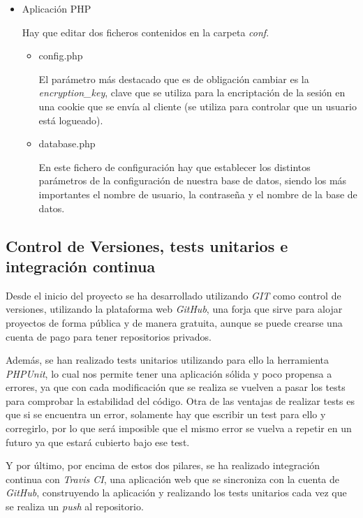 \begin{itemize}
		\item Aplicación PHP

			Hay que editar dos ficheros contenidos en la carpeta \emph{conf}.

			\begin{itemize}
				\item config.php

				El parámetro más destacado que es de obligación cambiar es la \emph{encryption\_key}, clave que se utiliza para la encriptación de la sesión en una cookie que se envía al cliente (se utiliza para controlar que un usuario está logueado).

				\item database.php

				En este fichero de configuración hay que establecer los distintos parámetros de la configuración de nuestra base de datos, siendo los más importantes el nombre de usuario, la contraseña y el nombre de la base de datos.

			\end{itemize}

	\end{itemize}

\subsection{Control de Versiones, tests unitarios e integración continua}

Desde el inicio del proyecto se ha desarrollado utilizando \emph{GIT} como control de versiones, utilizando la plataforma web \emph{GitHub}, una forja que sirve para alojar proyectos de forma pública y de manera gratuita, aunque se puede crearse una cuenta de pago para tener repositorios privados.

Además, se han realizado tests unitarios utilizando para ello la herramienta \emph{PHPUnit}, lo cual nos permite tener una aplicación sólida y poco propensa a errores, ya que con cada modificación que se realiza se vuelven a pasar los tests para comprobar la estabilidad del código. Otra de las ventajas de realizar tests es que si se encuentra un error, solamente hay que escribir un test para ello y corregirlo, por lo que será imposible que el mismo error se vuelva a repetir en un futuro ya que estará cubierto bajo ese test.

Y por último, por encima de estos dos pilares, se ha realizado integración continua con \emph{Travis CI}, una aplicación web que se sincroniza con la cuenta de \emph{GitHub}, construyendo la aplicación y realizando los tests unitarios cada vez que se realiza un \emph{push} al repositorio.

